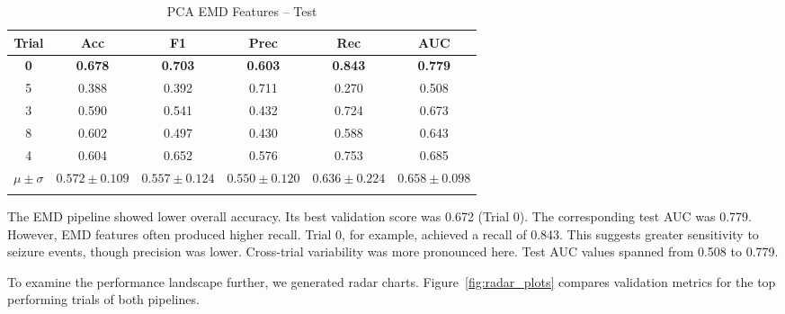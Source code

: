 \documentclass[pdflatex,sn-mathphys-num]{sn-jnl}%
\theoremstyle{thmstyleone}%
\theoremstyle{thmstyletwo}%
\theoremstyle{thmstylethree}%
\begin{document}
\begin{table}[h!]
\caption{PCA EMD Features -- Test}\label{tab:emd_test}
{\footnotesize
\begin{tabular*}{\textwidth}{@{\extracolsep\fill}cccccc}
\toprule
Trial & Acc & F1 & Prec & Rec & AUC \\
\midrule
\textbf{0} & \textbf{0.678} & \textbf{0.703} & \textbf{0.603} & \textbf{0.843} & \textbf{0.779} \\
5 & 0.388 & 0.392 & 0.711 & 0.270 & 0.508 \\
3 & 0.590 & 0.541 & 0.432 & 0.724 & 0.673 \\
8 & 0.602 & 0.497 & 0.430 & 0.588 & 0.643 \\
4 & 0.604 & 0.652 & 0.576 & 0.753 & 0.685 \\
\midrule
$\mu{\pm}\sigma$ & $0.572{\pm}0.109$ & $0.557{\pm}0.124$ & $0.550{\pm}0.120$ & $0.636{\pm}0.224$ & $0.658{\pm}0.098$ \\
\botrule
\end{tabular*}
}
\end{table}

The EMD pipeline showed lower overall accuracy. Its best validation score was 0.672 (Trial 0). The corresponding test AUC was 0.779. However, EMD features often produced higher recall. Trial 0, for example, achieved a recall of 0.843. This suggests greater sensitivity to seizure events, though precision was lower. Cross-trial variability was more pronounced here. Test AUC values spanned from 0.508 to 0.779.

To examine the performance landscape further, we generated radar charts. Figure~\ref{fig:radar_plots} compares validation metrics for the top performing trials of both pipelines.
\end{document}
